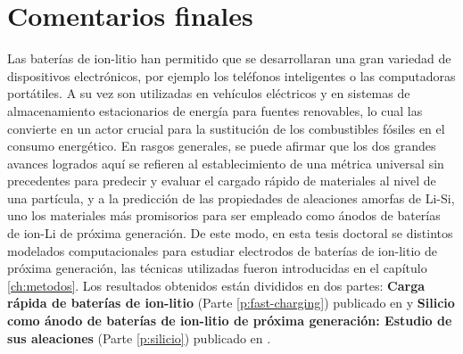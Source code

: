 \chapter{Comentarios finales}\label{ch:comentarios}

Las baterías de ion-litio han permitido que se desarrollaran una gran variedad de
dispositivos electrónicos, por ejemplo los teléfonos inteligentes o las 
computadoras portátiles. A su vez son utilizadas en vehículos eléctricos y en 
sistemas de almacenamiento estacionarios de energía para fuentes
renovables, lo cual las convierte en un actor crucial para la sustitución de 
los combustibles fósiles en el consumo energético. En rasgos generales, se puede
afirmar que los dos grandes avances logrados aquí se refieren al establecimiento
de una métrica universal sin precedentes para predecir y evaluar el cargado rápido
de materiales al nivel de una partícula, y a la predicción de las propiedades de 
aleaciones amorfas de Li-Si, uno los materiales más promisorios para ser empleado 
como ánodos de baterías de ion-Li de próxima generación. De este modo, en esta 
tesis doctoral se 
 distintos modelados computacionales para estudiar electrodos de 
baterías de ion-litio de próxima generación, las técnicas utilizadas fueron 
introducidas en el capítulo \ref{ch:metodos}. Los resultados obtenidos están 
divididos en dos partes: \textbf{Carga rápida de baterías de ion-litio} (Parte 
\ref{p:fast-charging}) publicado en \cite{fernandez2023towards} y \textbf{Silicio como ánodo
de baterías de ion-litio de próxima generación: Estudio de sus aleaciones} (Parte 
\ref{p:silicio}) publicado en \cite{fernandez2023nmr, oviedo2023, fernandez2021characterization}.

